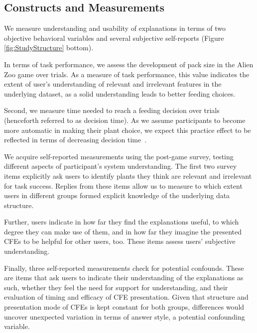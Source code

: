 \subsection{Constructs and Measurements}

We measure understanding and usability of explanations in terms of two objective behavioral variables and several subjective self-reports (Figure \ref{fig:StudyStructure} bottom). 

In terms of task performance, we assess the development of pack size in the Alien Zoo game over trials. 
As a measure of task performance, this value indicates the extent of user's understanding of relevant and irrelevant features in the underlying dataset, as a solid understanding leads to better feeding choices. 

Second, we measure time needed to reach a feeding decision over trials (henceforth referred to as decision time). As we assume participants to become more automatic in making their plant choice, we expect this practice effect to be reflected in terms of decreasing decision time~\citep{logan_shapes_1992}. 

We acquire self-reported measurements using the post-game survey, testing different aspects of participant’s system understanding. 
The first two survey items explicitly ask users to identify plants they think are relevant and irrelevant for task success. 
Replies from these items allow us to measure to which extent users in different groups formed explicit knowledge of the underlying data structure.

Further, users indicate in how far they find the explanations useful, to which degree they can make use of them, and in how far they imagine the presented \glspl{CFE} to be helpful for other users, too. These items assess users' subjective understanding.

Finally, three self-reported measurements check for potential confounds. 
These are items that ask users to indicate their understanding of the explanations as such, whether they feel the need for support for understanding, and their evaluation of timing and efficacy of \gls{CFE} presentation.
Given that structure and presentation mode of \glspl{CFE} is kept constant for both groups, differences would uncover unexpected variation in terms of answer style, a potential confounding variable.

